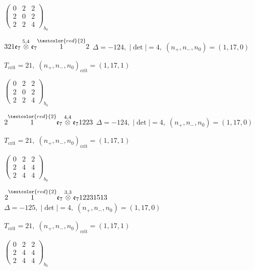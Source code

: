 \documentclass[10pt]{article}
\begin{document}
\hspace{2em}$\left(\begin{smallmatrix}0 & 2 & 2 \\ 2 & 0 & 2 \\ 2 & 2 & 4\end{smallmatrix}\right)_{\!b_0}$

\smallskip

$321\mathfrak{e}_7\overset{5,4}{\otimes}\mathfrak{e}_7\overset{\textcolor{red}{2}}{1}2$ \quad $\Delta=-124,\; |\det|=4,\; (n_+,n_-,n_0)=(1,17,0)$

\hspace{1em}$T_{\text{crit}}=21,\; (n_+,n_-,n_0)_{\text{crit}}=(1,17,1)$

\hspace{2em}$\left(\begin{smallmatrix}0 & 2 & 2 \\ 2 & 0 & 2 \\ 2 & 2 & 4\end{smallmatrix}\right)_{\!b_0}$

\smallskip

$2\overset{\textcolor{red}{2}}{1}\mathfrak{e}_7\overset{4,4}{\otimes}\mathfrak{e}_71223$ \quad $\Delta=-124,\; |\det|=4,\; (n_+,n_-,n_0)=(1,17,0)$

\hspace{1em}$T_{\text{crit}}=21,\; (n_+,n_-,n_0)_{\text{crit}}=(1,17,1)$

\hspace{2em}$\left(\begin{smallmatrix}0 & 2 & 2 \\ 2 & 4 & 4 \\ 2 & 4 & 4\end{smallmatrix}\right)_{\!b_0}$

\smallskip

$2\overset{\textcolor{red}{2}}{1}\mathfrak{e}_7\overset{3,3}{\otimes}\mathfrak{e}_712231513$ \quad $\Delta=-125,\; |\det|=4,\; (n_+,n_-,n_0)=(1,17,0)$

\hspace{1em}$T_{\text{crit}}=21,\; (n_+,n_-,n_0)_{\text{crit}}=(1,17,1)$

\hspace{2em}$\left(\begin{smallmatrix}0 & 2 & 2 \\ 2 & 4 & 4 \\ 2 & 4 & 4\end{smallmatrix}\right)_{\!b_0}$
\end{document}
